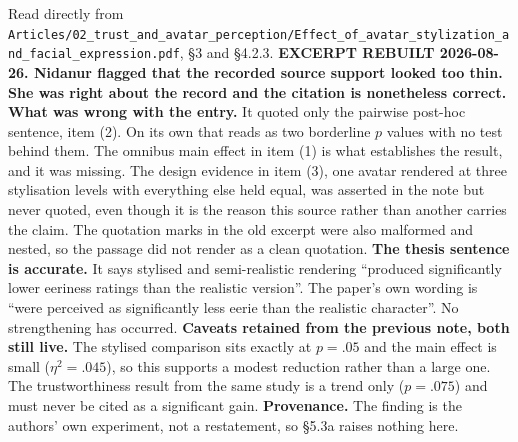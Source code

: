 \documentclass[11pt, a4paper]{article}
\begin{document}
\begin{Form}
  {Read directly from \texttt{\footnotesize Articles/02\_trust\_and\_avatar\_perception/Effect\_of\_avatar\_stylization\_and\_facial\_expression.pdf}, \S3 and \S4.2.3. \textbf{EXCERPT REBUILT 2026-08-26. Nidanur flagged that the recorded source support looked too thin. She was right about the record and the citation is nonetheless correct.} \textbf{What was wrong with the entry.} It quoted only the pairwise post-hoc sentence, item (2). On its own that reads as two borderline $p$ values with no test behind them. The omnibus main effect in item (1) is what establishes the result, and it was missing. The design evidence in item (3), one avatar rendered at three stylisation levels with everything else held equal, was asserted in the note but never quoted, even though it is the reason this source rather than another carries the claim. The quotation marks in the old excerpt were also malformed and nested, so the passage did not render as a clean quotation. \textbf{The thesis sentence is accurate.} It says stylised and semi-realistic rendering ``produced significantly lower eeriness ratings than the realistic version''. The paper's own wording is ``were perceived as significantly less eerie than the realistic character''. No strengthening has occurred. \textbf{Caveats retained from the previous note, both still live.} The stylised comparison sits exactly at $p = .05$ and the main effect is small ($\eta^2 = .045$), so this supports a modest reduction rather than a large one. The trustworthiness result from the same study is a trend only ($p = .075$) and must never be cited as a significant gain. \textbf{Provenance.} The finding is the authors' own experiment, not a restatement, so \S5.3a raises nothing here.}


\end{Form}
\end{document}
